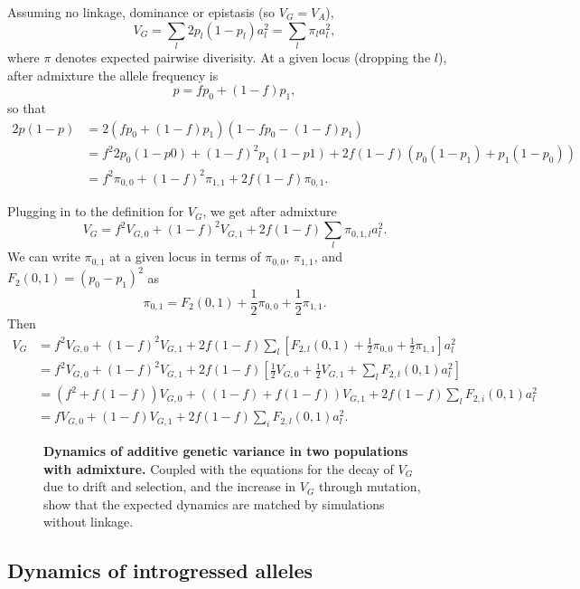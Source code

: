 \documentclass{article}
\begin{document}
Assuming no linkage, dominance or epistasis (so \(V_G=V_A\)),
\[V_G = \sum_l 2p_l(1-p_l)a_l^2 = \sum_l \pi_l a_l^2,\]
where $\pi$ denotes expected pairwise diverisity.
At a given locus (dropping the $l$), after admixture the allele frequency is
\[p=f p_0 + (1-f) p_1,\]
so that
\begin{align*}
    2p(1-p) & = 2(f p_0 + (1-f) p_1)(1 - f p_0 - (1-f) p_1) \\
    & = f^2 2p_0(1-p0) + (1-f)^2 p_1(1-p1) + 2f(1-f) (p_0(1-p_1) + p_1(1-p_0)) \\
    & = f^2 \pi_{0,0} + (1-f)^2 \pi_{1,1} + 2f(1-f)\pi_{0,1}.
\end{align*}

Plugging in to the definition for $V_G$, we get after admixture
\[V_G = f^2 V_{G,0} + (1-f)^2 V_{G,1} + 2f(1-f)\sum_l \pi_{0,1,l}a_l^2.\]
We can write $\pi_{0,1}$ at a given locus in terms of $\pi_{0,0}$, $\pi_{1,1}$,
and $F_2(0,1)=(p_0-p_1)^2$ as \citep{peter2016admixture}
\[\pi_{0,1} = F_2(0,1) + \frac{1}{2}\pi_{0,0} + \frac{1}{2}\pi_{1,1}.\]
Then
\begin{align*}
    V_G & = f^2 V_{G,0} + (1-f)^2 V_{G,1} + 2f(1-f)\sum_l \left[F_{2,l}(0,1)
    + \frac{1}{2}\pi_{0,0} + \frac{1}{2}\pi_{1,1}\right] a_l^2 \\
    & = f^2 V_{G,0} + (1-f)^2 V_{G,1} + 2f(1-f)\left[\frac{1}{2}V_{G,0} 
    + \frac{1}{2}V_{G,1} + \sum_l F_{2,l}(0,1)a_l^2\right] \\
    & = \left(f^2 + f(1-f)\right) V_{G,0} + \left((1-f) + f(1-f)\right)V_{G,1}
    + 2f(1-f) \sum_l F_{2,i}(0,1)a_l^2 \\
    & = f V_{G,0} + (1-f)V_{G,1} + 2f(1-f)\sum_i F_{2,l}(0,1)a_l^2.
\end{align*}


\begin{figure}[ht!]
    \centering
    \caption{
        \textbf{Dynamics of additive genetic variance in two populations with admixture.}
        Coupled with the equations for the decay of $V_G$ due to drift and selection,
        and the increase in $V_G$ through mutation, show that the expected dynamics
        are matched by simulations without linkage.
    }
    \label{fig:VG_dynamics}
\end{figure}

\subsection{Dynamics of introgressed alleles}
\end{document}
